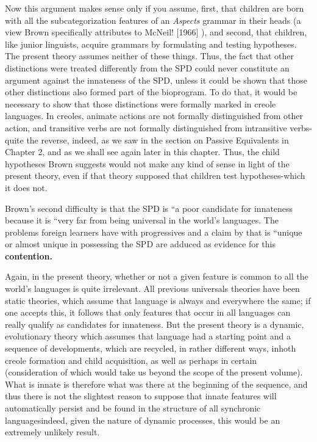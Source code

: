 Now this argument makes sense only if you assume, first, that
% 
children are born with all the subcategorization features of an \textit{Aspects} grammar in their heads (a view Brown specifically attributes to McNeil! [1966] ), and second, that children, like junior linguists, acquire gram\-mars by formulating and testing hypotheses. The present theory as\-sumes neither of these things. Thus, the fact that other distinctions were treated differently from the SPD could never constitute an argu\-ment against the innateness of the SPD, unless it could be shown that those other distinctions also formed part of the bioprogram. To do that, it would be necessary to show that those distinctions were for\-mally marked in creole languages. In creoles, animate actions are not formally distinguished from other  action, and transitive verbs are not formally distinguished from intransitive verbs-quite the reverse, indeed, as we saw in the section on Passive Equivalents in Chapter 2, and as we shall see again later in this chapter. Thus, the child hy\-potheses Brown suggests would not make any kind of sense in light of the present theory, even if that theory supposed that children test hypotheses-which it does not.

Brown's second difficulty is that the SPD is ``a poor candidate
for innateness because it is ``very far from being universal in the world's languages. The problems foreign learners have with  progressives and a claim by \citet{Joos1964} that  is ``unique or almost unique in possessing the SPD are adduced as evidence for this \textbf{contention.}

Again, in the present theory, whether or not a given feature is common to all the world's languages is quite irrelevant. All previous universals theories have been static theories, which assume that lan\-guage is always and everywhere the same; if one accepts this, it follows that only features that occur in all languages can really qualify as can\-didates for innateness. But the present theory is a dynamic, evolu\-tionary theory which assumes that language had a starting point and a sequence of developments, which are recycled, in rather different ways, inhoth creole formation and child acquisition, as well as perhaps in certain   (consideration of which would take us beyond the scope of the present volume). What is innate is therefore
what was there at the beginning of the sequence, and thus there is not the slightest reason to suppose that innate features will automati\-cally persist and be found in the structure of all synchronic languages\-indeed, given the nature of dynamic processes, this would be an ex\-tremely unlikely result.

